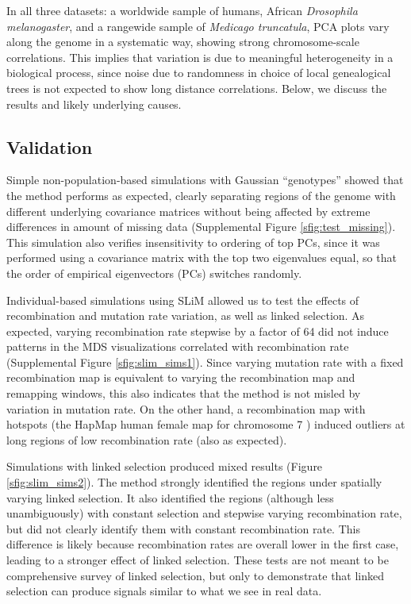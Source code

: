 \documentclass[11pt, oneside]{article}   	%
\newcommand\citep{\cite}
\renewcommand{\llabel}[1]{\relax}
\begin{document}
In all three datasets:
a worldwide sample of humans, African \textit{Drosophila melanogaster},
and a rangewide sample of \textit{Medicago truncatula},
PCA plots vary along the genome in a systematic way, showing strong chromosome-scale correlations.
This implies that variation is due to meaningful heterogeneity in a biological process,
since noise due to randomness in choice of local genealogical trees
is not expected to show long distance correlations. 
Below, we discuss the results and likely underlying causes.




\subsection{Validation}
\label{ss:validation}

Simple non-population-based simulations with Gaussian ``genotypes''
showed that the method performs as expected, clearly separating regions of the genome
with different underlying covariance matrices
without being affected by extreme differences in amount of missing data
(Supplemental Figure \ref{sfig:test_missing}).
This simulation also verifies insensitivity to ordering of top PCs,
since it was performed using a covariance matrix with the top two eigenvalues equal,  
so that the order of empirical eigenvectors (PCs) switches randomly.

Individual-based simulations using SLiM \citep{haller2017flexible} allowed us to test the effects
of recombination and mutation rate variation, as well as linked selection.
As expected, varying recombination rate stepwise by a factor of 64
did not induce patterns in the MDS visualizations correlated with recombination rate
(Supplemental Figure \ref{sfig:slim_sims1}).
\llabel{ll:test_recomb_rate}
Since varying mutation rate with a fixed recombination map
is equivalent to varying the recombination map and remapping windows,
this also indicates that the method is not misled by variation in mutation rate.
On the other hand,
a recombination map with hotspots
(the HapMap human female map for chromosome 7 \citep{hapmap2007second})
induced outliers at long regions of low recombination rate
(also as expected). \llabel{ll:hotspot_recomb}

Simulations with linked selection produced mixed results
(Figure \ref{sfig:slim_sims2}).
The method strongly identified the regions under spatially varying linked selection.
It also identified the regions (although less unambiguously)
with constant selection and stepwise varying recombination rate,
but did not clearly identify them with constant recombination rate.
This difference is likely because recombination rates are overall lower in the first case,
leading to a stronger effect of linked selection.
These tests are not meant to be comprehensive survey of linked selection,
but only to demonstrate that linked selection can produce signals similar to what we see in real data.
\end{document}
